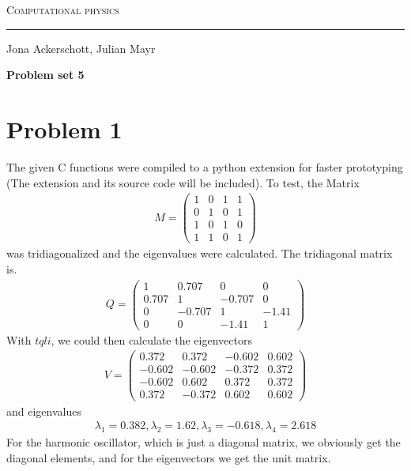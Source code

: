 \documentclass[12pt, a4paper]{article}
\begin{document}
  \centerline{\Huge\scshape Computational physics}
  \vspace*{0.5cm}
  \hrule
  \vspace*{0.5cm}
  \centerline{Jona Ackerschott, Julian Mayr}
  \vspace*{1cm}
  \centerline{\Large\bfseries Problem set 5}
  \vspace*{0.5cm}

  \section*{Problem 1}
  	The given C functions were compiled to a python extension for faster prototyping (The extension and its source code will be included). To test, the Matrix
  	\begin{align}
  		M=
  		\begin{pmatrix}
  		1&0&1&1\\
  		0&1&0&1\\
  		1&0&1&0\\
  		1&1&0&1
  		\end{pmatrix}
  	\end{align}
  	was tridiagonalized and the eigenvalues were calculated.
  	The tridiagonal matrix is.
  	\begin{align}
  	Q=
  	\begin{pmatrix}
  	1&0.707&0&0\\
  	0.707&1&-0.707&0\\
  	0&-0.707&1&-1.41\\
  	0&0&-1.41&1
  	\end{pmatrix}
  	\end{align}
  	With $tqli$, we could then calculate the  eigenvectors
  	\begin{align}
  		V=
  		\begin{pmatrix}
  		0.372&0.372&-0.602&0.602\\
  		-0.602&-0.602&-0.372&0.372\\
  		-0.602&0.602&0.372&0.372\\
  		0.372&-0.372&0.602&0.602
  		\end{pmatrix}
  	\end{align}
  	and eigenvalues
  	\begin{align}
  		\lambda_1=0.382, \lambda_2=1.62, \lambda_3=-0.618, \lambda_4=2.618
  	\end{align}
  	For the harmonic oscillator, which is just a diagonal matrix, we obviously get the diagonal elements, and for the eigenvectors we get the unit matrix.
\end{document}
